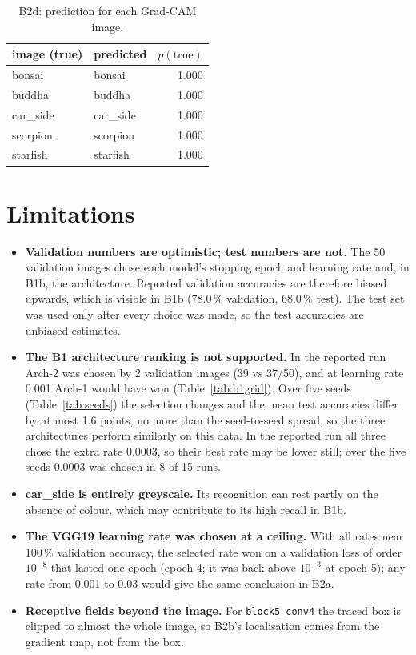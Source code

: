 \documentclass[11pt,a4paper]{article}
\newcommand{\code}[1]{\texttt{#1}}
\begin{document}
\begin{table}[H]\centering\small\begin{tabular}{@{}llr@{}}\toprule image (true) & predicted & $p(\text{true})$ \\ \midrule
bonsai & bonsai & 1.000 \\
buddha & buddha & 1.000 \\
car\_side & car\_side & 1.000 \\
scorpion & scorpion & 1.000 \\
starfish & starfish & 1.000 \\
\bottomrule\end{tabular}
\caption{B2d: prediction for each Grad-CAM image.}\label{tab:b2d}
\end{table}

\section{Limitations}\label{sec:limits}
\begin{itemize}[leftmargin=*,itemsep=2pt]
\item \textbf{Validation numbers are optimistic; test numbers are not.}  The 50 validation images
  chose each model's stopping epoch and learning rate and, in B1b, the architecture.  Reported
  validation accuracies are therefore biased upwards, which is visible in B1b
  (78.0\,\% validation, 68.0\,\% test).  The test set was used only
  after every choice was made, so the test accuracies are unbiased estimates.
\item \textbf{The B1 architecture ranking is not supported.}  In the reported run Arch-2 was
  chosen by 2 validation images (39 vs 37/50), and at learning rate 0.001 Arch-1 would have won
  (Table~\ref{tab:b1grid}).  Over five seeds (Table~\ref{tab:seeds}) the selection changes and the
  mean test accuracies differ by at most 1.6 points, no more than the seed-to-seed spread, so the three architectures
  perform similarly on this data.  In the reported run all three chose the extra rate 0.0003, so
  their best rate may be lower still; over the five seeds 0.0003 was chosen in 8 of 15 runs.
\item \textbf{car\_side is entirely greyscale.}  Its recognition can rest partly on the absence of
  colour, which may contribute to its high recall in B1b.
\item \textbf{The VGG19 learning rate was chosen at a ceiling.}  With all rates near 100\,\%
  validation accuracy, the selected rate won on a validation loss of order $10^{-8}$ that lasted one
  epoch (epoch 4; it was back above $10^{-3}$ at epoch 5); any rate from 0.001 to 0.03 would give the same conclusion in B2a.
\item \textbf{Receptive fields beyond the image.}  For \code{block5\_conv4} the traced box is
  clipped to almost the whole image, so B2b's localisation comes from the gradient map, not from
  the box.
\end{itemize}
\end{document}

